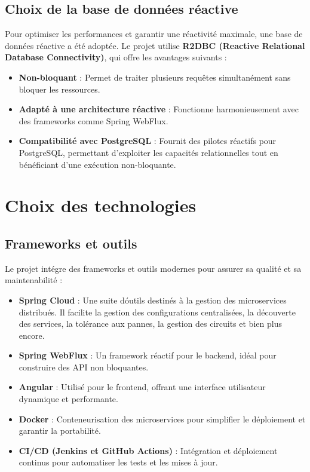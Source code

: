 \documentclass[12pt,a4paper]{report}
\begin{document}
\subsection*{Choix de la base de donn\'ees r\'eactive}
Pour optimiser les performances et garantir une r\'eactivit\'e maximale, une base de donn\'ees r\'eactive a \'et\'e adopt\'ee. Le projet utilise \textbf{R2DBC (Reactive Relational Database Connectivity)}, qui offre les avantages suivants :
\begin{itemize}
    \item \textbf{Non-bloquant} : Permet de traiter plusieurs requ\^etes simultan\'ement sans bloquer les ressources.
    \item \textbf{Adapt\'e \`a une architecture r\'eactive} : Fonctionne harmonieusement avec des frameworks comme Spring WebFlux.
    \item \textbf{Compatibilit\'e avec PostgreSQL} : Fournit des pilotes r\'eactifs pour PostgreSQL, permettant d'exploiter les capacit\'es relationnelles tout en b\'en\'eficiant d'une ex\'ecution non-bloquante.
\end{itemize}

\newpage
\section{Choix des technologies}
\subsection*{Frameworks et outils}
Le projet int\'egre des frameworks et outils modernes pour assurer sa qualit\'e et sa maintenabilit\'e :
\begin{itemize}
    \item \textbf{Spring Cloud} : Une suite d\'outils destinés à la gestion des microservices distribués. Il facilite la gestion des configurations centralisées, la découverte des services, la tolérance aux pannes, la gestion des circuits et bien plus encore.
    \item \textbf{Spring WebFlux} : Un framework r\'eactif pour le backend, id\'eal pour construire des API non bloquantes.
    \item \textbf{Angular} : Utilis\'e pour le frontend, offrant une interface utilisateur dynamique et performante.
    \item \textbf{Docker} : Conteneurisation des microservices pour simplifier le d\'eploiement et garantir la portabilit\'e.
    \item \textbf{CI/CD (Jenkins et GitHub Actions)} : Int\'egration et d\'eploiement continus pour automatiser les tests et les mises \`a jour.
\end{itemize}
\end{document}
